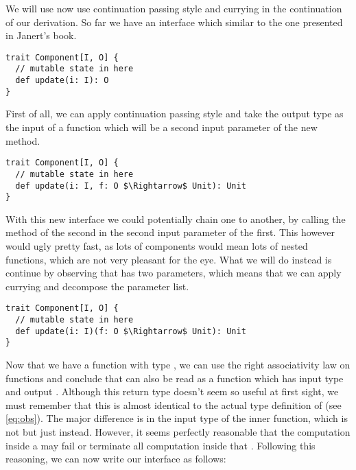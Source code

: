 We will use now use continuation passing style and currying in the continuation of our derivation. So far we have an interface which similar to the one presented in Janert's book.

\begin{lstlisting}[style=InlineScalaStyle]
trait Component[I, O] {
  // mutable state in here
  def update(i: I): O
}
\end{lstlisting}

First of all, we can apply continuation passing style and take the output type  as the input of a function which will be a second input parameter of the new  method.

\begin{lstlisting}[style=InlineScalaStyle]
trait Component[I, O] {
  // mutable state in here
  def update(i: I, f: O $\Rightarrow$ Unit): Unit
}
\end{lstlisting}

With this new interface we could potentially chain one \comp to another, by calling the  method of the second \comp in the second input parameter of the first. This however would ugly pretty fast, as lots of components would mean lots of nested functions, which are not very pleasant for the eye. What we will do instead is continue by observing that  has two parameters, which means that we can apply currying and decompose the parameter list.

\begin{lstlisting}[style=InlineScalaStyle]
trait Component[I, O] {
  // mutable state in here
  def update(i: I)(f: O $\Rightarrow$ Unit): Unit
}
\end{lstlisting}

Now that we have a function  with type , we can use the right associativity law on functions and conclude that  can also be read as a function which has input type  and output . Although this return type doesn't seem so useful at first sight, we must remember that this is almost identical to the actual type definition of \obs (see \cref{eq:obs}). The major difference is in the input type of the inner function, which is not  but just  instead. However, it seems perfectly reasonable that the computation inside a \comp may fail or terminate all computation inside that \comp. Following this reasoning, we can now write our interface as follows:

